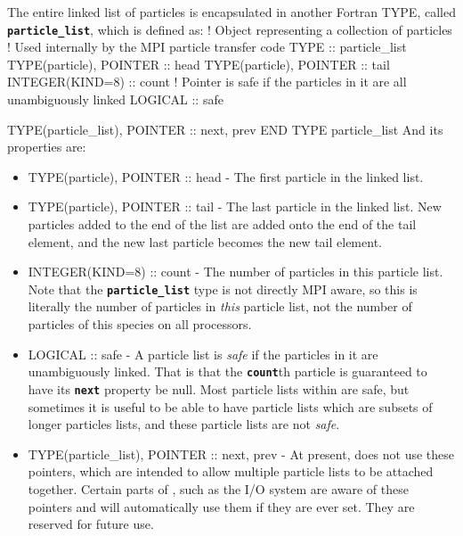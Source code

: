 \documentclass[12pt,a4paper]{article}
\newcommand{\inlinecode}[1]{{\color{warwickred} \bf\texttt{#1}}}
\newcommand{\EPOCH}{{\color{warwickdark}\fontfamily{phv}\selectfont{EPOCH}}}
\newenvironment{boxverbatim}{\lboxverbatim{none}}{\endlboxverbatim}
\begin{document}
The entire linked list of particles is encapsulated in another Fortran TYPE,
called \inlinecode{particle\_list}, which is defined as:
\begin{boxverbatim}
! Object representing a collection of particles
! Used internally by the MPI particle transfer code
TYPE :: particle_list
  TYPE(particle), POINTER :: head
  TYPE(particle), POINTER :: tail
  INTEGER(KIND=8) :: count
  ! Pointer is safe if the particles in it are all unambiguously linked
  LOGICAL :: safe

  TYPE(particle_list), POINTER :: next, prev
END TYPE particle_list
\end{boxverbatim}
And its properties are:
\begin{itemize}
\item TYPE(particle), POINTER :: head - The first particle in the linked list.
\item TYPE(particle), POINTER :: tail - The last particle in the linked
  list. New particles added to the end of the list are added onto the end of
  the tail element, and the new last particle becomes the new tail element.
\item INTEGER(KIND=8) :: count - The number of particles in this particle
  list. Note that the \inlinecode{particle\_list} type is not directly MPI
  aware, so this is literally the number of particles in {\it this} particle
  list, not the number of particles of this species on all processors.
\item LOGICAL :: safe - A particle list is {\it safe} if the particles in it
  are unambiguously linked. That is that the \inlinecode{count}th particle is
  guaranteed to have its \inlinecode{next} property be null. Most particle
  lists within {\EPOCH} are safe, but sometimes it is useful to be able to have
  particle lists which are subsets of longer particles lists, and these
  particle lists are not {\it safe}.
\item TYPE(particle\_list), POINTER :: next, prev - At present, {\EPOCH} does
  not use these pointers, which are intended to allow multiple particle lists to
  be attached together. Certain parts of {\EPOCH}, such as the I/O system are
  aware of these pointers and will automatically use them if they are ever
  set. They are reserved for future use.
\end{itemize}
\end{document}

